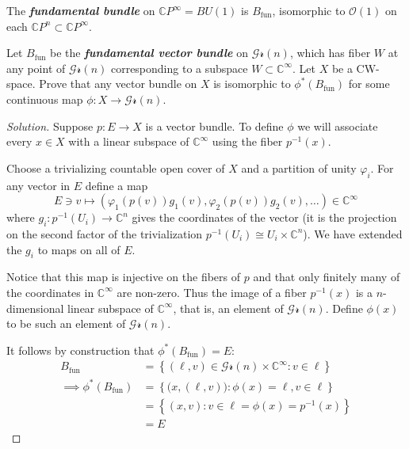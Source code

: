 \begin{defn}
	The \textit{\textbf{fundamental bundle}} on $\mathbb{C}P^\infty=BU(1)$ is $B_{\operatorname{fun}}$, isomorphic to $\mathcal{O}(1)$ on each $\mathbb{C}P^{n}\subset \mathbb{C}P^\infty$.
\end{defn}

\iffalse\addcontentsline{toc}{subsection}{Exercise 3.2}
\begin{manualexercise}{3.2}
	Let $X$ be a compact CW-cpasce. Prove that any line bundle on  $X$ is isomorphic to $\phi^*(B_{\operatorname{fun}})$ for some continuous map $\phi :X\to BU(1)$
\end{manualexercise}\fi

\begin{manualexercise}{3.3}
	Let $B_{\operatorname{fun}}$ be the \textit{\textbf{fundamental vector bundle}} on $\mathcal{Gr}(n)$, which has fiber $W$ at any point of $\mathcal{Gr}(n)$ corresponding to a subspace $W\subset \mathbb{C}^\infty$. Let $X$ be a CW-space. Prove that any vector bundle on $X$ is isomorphic to $\phi^*(B_{\operatorname{fun}})$ for some continuous map $\phi :X\longrightarrow \mathcal{Gr}(n)$.
\end{manualexercise}

\begin{proof}[Solution]\leavevmode
 Suppose $p:E\to X$ is a vector bundle. To define $\phi$ we will associate every $x \in X$ with a linear subspace of $\mathbb{C}^\infty$ using the fiber $p^{-1}(x)$.

 Choose a trivializing countable open cover of $X$ and a partition of unity $\varphi_i$. For any vector in $E$ define a map
  \[E\ni v\longmapsto(\varphi_1(p(v))g_1(v),\varphi_2(p(v))g_2(v),\ldots )\in\mathbb{C}^\infty\]
where $g_i:p^{-1}(U_i)\to \mathbb{C}^n$ gives the coordinates of the vector (it is the projection on the second factor of the trivialization $p^{-1}(U_i)\cong U_i\times \mathbb{C}^n$). We have extended the $g_i$ to maps on all of $E$.

Notice that this map is injective on the fibers of $p$ and that only finitely many of the coordinates in $\mathbb{C}^\infty$ are non-zero. Thus the image of a fiber $p^{-1}(x)$ is a $n$-dimensional linear subspace of $\mathbb{C}^\infty$, that is, an element of $\mathcal{Gr}(n)$. Define $\phi(x)$ to be such an element of $\mathcal{Gr}(n)$.

It follows by construction that $\phi^* (B_{\operatorname{fun}})= E$:
\begin{align*}
	B_{\operatorname{fun}}&=\left\{(\ell,v)\in\mathcal{Gr}(n)\times \mathbb{C}^\infty:v\in\ell\right\}\\
	\implies  \phi^* (B_{\operatorname{fun}})&=\left\{ \big( x,(\ell,v) \big) :\phi(x)=\ell , v\in\ell\right\} \\
	&=\left\{(x,v):v\in\ell=\phi(x)=p^{-1}(x)\right\}\\
	&=E
\end{align*}
\end{proof}

